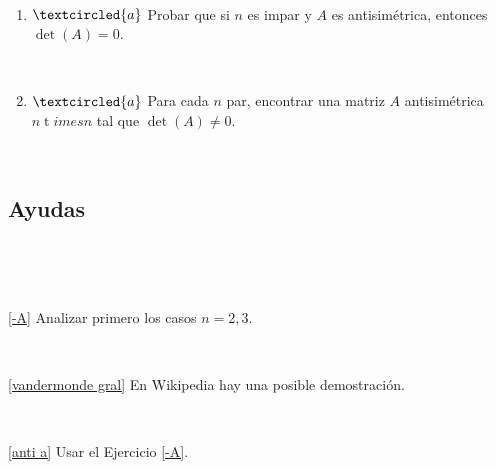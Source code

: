 \documentclass[12pt]{amsart}
\begin{document}
\begin{enumerate}[resume]
\

\begin{enumerate}
\item\label{anti a} $\textcircled{a}$ Probar que si $n$ es impar y $A$ es antisim\'etrica, entonces
$\det(A)=0$.

\

\item\label{anti b} $\textcircled{a}$ Para cada $n$ par, encontrar una matriz $A$ antisim\'etrica
$n {\operatorname t}imes n$ tal que $\det(A)\not=0$.
\end{enumerate}

%
	
	
\end{enumerate}

\

\subsection*{Ayudas}

\

\

\eqref{-A} Analizar primero los casos $n=2,3$.

\

\eqref{vandermonde gral} En Wikipedia hay una posible demostraci\'on.

\

\eqref{anti a} Usar el Ejercicio \eqref{-A}.

\
\end{document}
